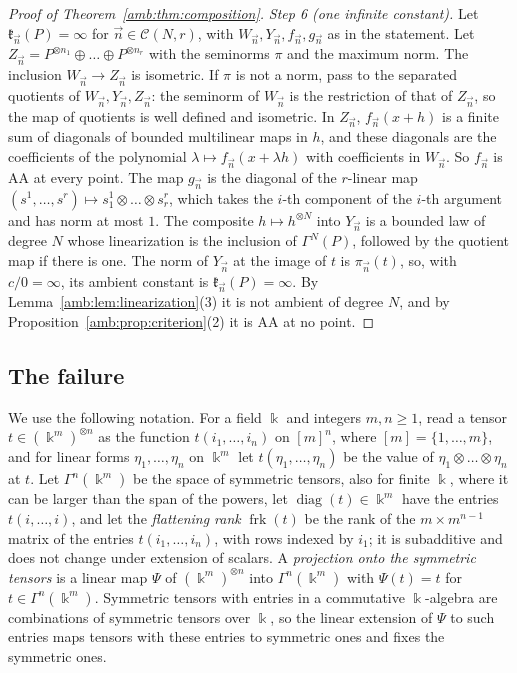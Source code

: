 \begin{proof}[Proof of Theorem~\ref{amb:thm:composition}]
\emph{Step 6 (one infinite constant).} Let $\mathfrak k_{\vec n}(P)=\infty$ for $\vec n\in\mathcal C(N,r)$, with $W_{\vec n},Y_{\vec n},f_{\vec n},g_{\vec n}$ as in the statement. Let $Z_{\vec n}=P^{\otimes n_1}\oplus\dots\oplus P^{\otimes n_r}$ with the seminorms $\pi$ and the maximum norm. The inclusion $W_{\vec n}\to Z_{\vec n}$ is isometric. If $\pi$ is not a norm, pass to the separated quotients of $W_{\vec n},Y_{\vec n},Z_{\vec n}$: the seminorm of $W_{\vec n}$ is the restriction of that of $Z_{\vec n}$, so the map of quotients is well defined and isometric. In $Z_{\vec n}$, $f_{\vec n}(x+h)$ is a finite sum of diagonals of bounded multilinear maps in $h$, and these diagonals are the coefficients of the polynomial $\lambda\mapsto f_{\vec n}(x+\lambda h)$ with coefficients in $W_{\vec n}$. So $f_{\vec n}$ is AA at every point. The map $g_{\vec n}$ is the diagonal of the $r$-linear map $(s^1,\dots,s^r)\mapsto s^1_1\otimes\dots\otimes s^r_r$, which takes the $i$-th component of the $i$-th argument and has norm at most $1$. The composite $h\mapsto h^{\otimes N}$ into $Y_{\vec n}$ is a bounded law of degree $N$ whose linearization is the inclusion of $\Gamma^N(P)$, followed by the quotient map if there is one. The norm of $Y_{\vec n}$ at the image of $t$ is $\pi_{\vec n}(t)$, so, with $c/0=\infty$, its ambient constant is $\mathfrak k_{\vec n}(P)=\infty$. By Lemma~\ref{amb:lem:linearization}(3) it is not ambient of degree $N$, and by Proposition~\ref{amb:prop:criterion}(2) it is AA at no point.
\end{proof}

\subsection{The failure}\label{amb:ssec:proofs-failure}

We use the following notation. For a field $\Bbbk$ and integers
$m,n\ge1$, read a tensor $t\in(\Bbbk^m)^{\otimes n}$ as the function
$t(i_1,\dots,i_n)$ on $[m]^n$, where $[m]=\{1,\dots,m\}$, and for linear forms $\eta_1,\dots,\eta_n$ on $\Bbbk^m$ let $t(\eta_1,\dots,\eta_n)$ be
the value of $\eta_1\otimes\dots\otimes\eta_n$ at $t$. Let $\Gamma^n(\Bbbk^m)$ be the space of symmetric tensors, also for finite $\Bbbk$, where it can be larger than the span of the powers, let
$\operatorname{diag}(t)\in\Bbbk^m$ have the entries $t(i,\dots,i)$, and let the \emph{flattening rank}
$\operatorname{frk}(t)$ be the rank of the $m\times m^{n-1}$ matrix of the entries $t(i_1,\dots,i_n)$, with rows indexed by
$i_1$; it is subadditive and does not change under extension of scalars. A \emph{projection onto the symmetric tensors}
is a linear map $\Psi$ of $(\Bbbk^m)^{\otimes n}$ into $\Gamma^n(\Bbbk^m)$ with $\Psi(t)=t$ for $t\in\Gamma^n(\Bbbk^m)$.
Symmetric tensors with entries in a commutative $\Bbbk$\nobreakdash-algebra are combinations of symmetric tensors over
$\Bbbk$, so the linear extension of $\Psi$ to such entries maps tensors with these entries to symmetric ones and fixes
the symmetric ones.


